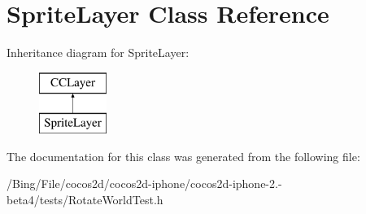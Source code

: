 \hypertarget{interface_sprite_layer}{\section{Sprite\-Layer Class Reference}
\label{interface_sprite_layer}
}
Inheritance diagram for Sprite\-Layer\-:\begin{figure}[H]
\begin{center}
\leavevmode
\includegraphics[height=2.000000cm]{interface_sprite_layer}
\end{center}
\end{figure}


The documentation for this class was generated from the following file\-:\begin{DoxyCompactItemize}
\item 
/\-Bing/\-File/cocos2d/cocos2d-\/iphone/cocos2d-\/iphone-\/2.-\/beta4/tests/Rotate\-World\-Test.\-h\end{DoxyCompactItemize}
